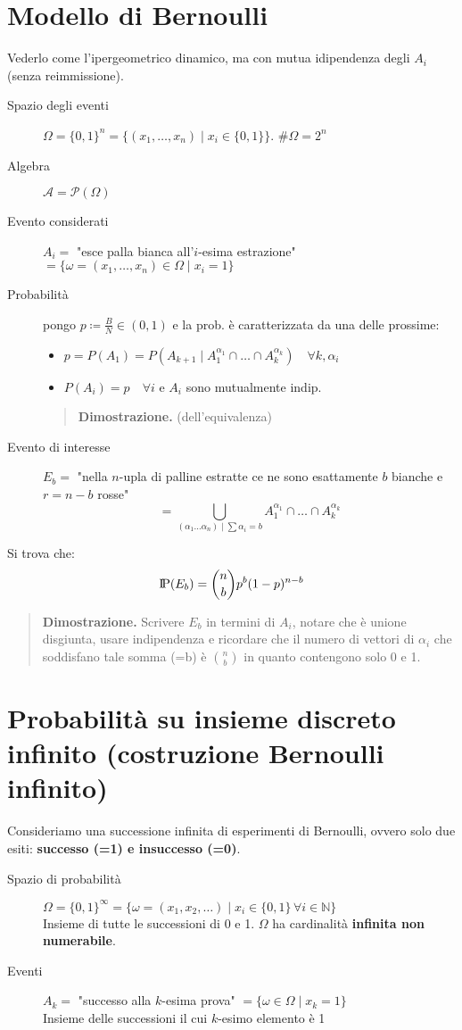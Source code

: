 \documentclass[a4paper,10pt]{article}
\newcommand{\pr}{\text{I\kern-0.15em P}} %
\theoremstyle{remark}
\theoremstyle{definition}
\newenvironment{dimo}{\begin{quote}\textbf{Dimostrazione.}}{\end{quote}} %
\begin{document}
\section{Modello di Bernoulli}
Vederlo come l'ipergeometrico dinamico, ma con mutua idipendenza degli $A_i$ (senza reimmissione).
\begin{description}
    \item[Spazio degli eventi] $\Omega=\{0,1\}^n=\{(x_1,\dots,x_n) \mid x_i\in \{0,1\}\}$. $\#\Omega=2^n$
    \item[Algebra] $\mathcal{A}=\mathscr{P}(\Omega)$
    \item[Evento considerati] $A_i=$ "esce palla bianca all'$i$-esima estrazione" $=\{\omega = (x_1,\dots,x_n)\in \Omega \mid x_i=1\}$
    \item[Probabilità] pongo $p\coloneqq \frac{B}{N}\in(0,1)$ e la prob. è caratterizzata da una delle prossime:
    \begin{itemize}
        \item $p=P(A_1)=P(A_{k+1} \mid A_1^{\alpha_1}\cap\dots\cap A_k^{\alpha_k}) \quad \forall k,\alpha_i$
        \item $P(A_i)=p \quad \forall i$ e $A_i$ sono mutualmente indip.
    \end{itemize}
    \begin{dimo}
        (dell'equivalenza)
    \end{dimo}
    \item[Evento di interesse] $E_b =$ "nella $n$-upla di palline estratte ce ne sono esattamente $b$ bianche e $r=n-b$ rosse" 
    $$=\bigcup_{(\alpha_1 \dots \alpha_n)\mid\sum\alpha_i=b}A_1^{\alpha_1}\cap\dots\cap A_k^{\alpha_k}$$
    \end{description}
    Si trova che:
    $$\pr(E_b)=\binom{n}{b}p^b(1-p)^{n-b}$$
    \begin{dimo}
        Scrivere $E_b$ in termini di $A_i$, notare che è unione disgiunta, usare indipendenza e ricordare che  il numero di vettori di $\alpha_i$ che soddisfano tale somma (=b) è $\binom{n}{b}$ in quanto contengono solo 0 e 1.
    \end{dimo}


\section{Probabilità su insieme discreto infinito (costruzione Bernoulli infinito)}
Consideriamo una successione infinita di esperimenti di Bernoulli, ovvero solo due esiti: \textbf{successo (=1) e insuccesso (=0)}. 
\vspace{\baselineskip}
\begin{description}
    \item[Spazio di probabilità] $\Omega=\{0,1\}^\infty=\{\omega=(x_1,x_2,\dots) \mid x_i\in\{0,1\} \, \forall i\in\mathbb{N}\}$ \\
    Insieme di tutte le successioni di 0 e 1. $\Omega$ ha cardinalità \textbf{infinita non numerabile}.
    \item[Eventi] $A_k=$ "successo alla $k$-esima prova" $=\{\omega \in \Omega \mid x_k=1\}$ \\
    Insieme delle successioni il cui $k$-esimo elemento è 1
\end{description}
\end{document}
